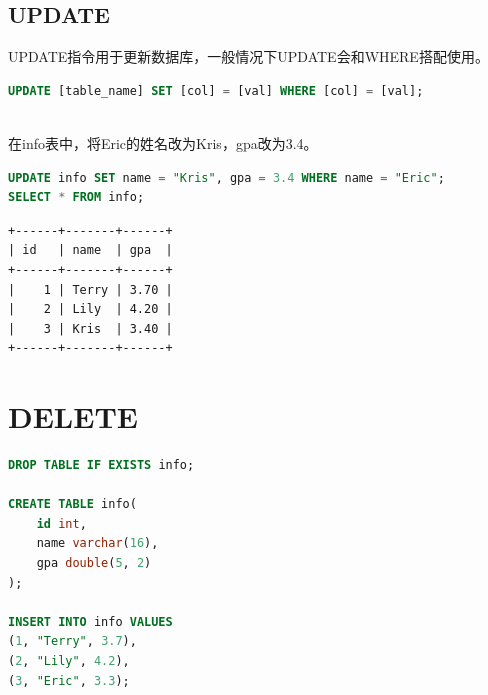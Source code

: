 \documentclass[12pt, openany, oneside]{book}
\begin{document}
\vspace{0.5cm}

\section{UPDATE}

UPDATE指令用于更新数据库，一般情况下UPDATE会和WHERE搭配使用。

\vspace{-0.5cm}

\begin{lstlisting}[language=SQL]
UPDATE [table_name] SET [col] = [val] WHERE [col] = [val];
\end{lstlisting}

\vspace{0.5cm}

\\

在info表中，将Eric的姓名改为Kris，gpa改为3.4。

\vspace{-0.5cm}

\begin{lstlisting}[language=SQL]
UPDATE info SET name = "Kris", gpa = 3.4 WHERE name = "Eric";
SELECT * FROM info;
\end{lstlisting}

\begin{tcolorbox}
	\begin{verbatim}
+------+-------+------+
| id   | name  | gpa  |
+------+-------+------+
|    1 | Terry | 3.70 |
|    2 | Lily  | 4.20 |
|    3 | Kris  | 3.40 |
+------+-------+------+
\end{verbatim}
\end{tcolorbox}

\newpage

\chapter{DELETE}

\vspace{0.5cm}


\begin{lstlisting}[language=SQL]
DROP TABLE IF EXISTS info;

CREATE TABLE info(
    id int,
    name varchar(16),
    gpa double(5, 2)
);

INSERT INTO info VALUES
(1, "Terry", 3.7),
(2, "Lily", 4.2),
(3, "Eric", 3.3);
\end{lstlisting}
\end{document}
